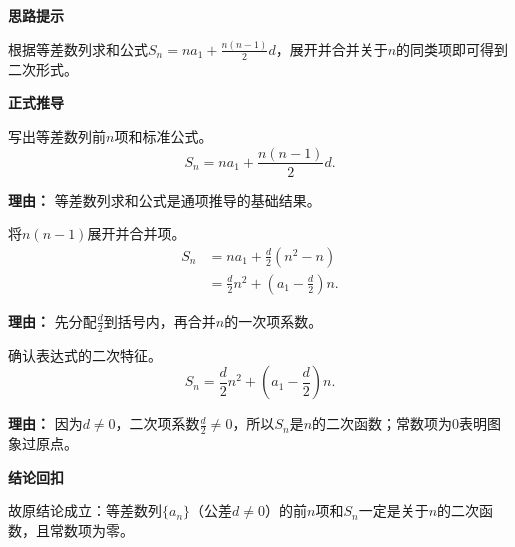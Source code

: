 \begin{proofbox}
	\textbf{\textcolor{CProof}{思路提示}}

	根据等差数列求和公式$S_n = n a_1 + \frac{n(n-1)}{2}d$，展开并合并关于$n$的同类项即可得到二次形式。

	\medskip
	\textbf{\textcolor{CProof}{正式推导}}
	\begin{description}[style=nextline, leftmargin=2.8em, labelsep=0.5em, itemsep=0.55em]
		\item[\textbf{步骤一（求和平式）：}] 写出等差数列前$n$项和标准公式。
			\[
				S_n = n a_1 + \frac{n(n-1)}{2}d.
			\]
			\par\textbf{理由：} 等差数列求和公式是通项推导的基础结果。

		\item[\textbf{步骤二（展开合并）：}] 将$n(n-1)$展开并合并项。
			\[
				\begin{aligned}
					S_n &= n a_1 + \frac{d}{2}(n^2 - n) \\
					&= \frac{d}{2}n^2 + \left(a_1 - \frac{d}{2}\right)n.
			\end{aligned}
			\]
			\par\textbf{理由：} 先分配$\frac{d}{2}$到括号内，再合并$n$的一次项系数。

		\item[\textbf{步骤三（二次确认）：}] 确认表达式的二次特征。
			\[
				S_n = \frac{d}{2}n^2 + \left(a_1 - \frac{d}{2}\right)n.
			\]
			\par\textbf{理由：} 因为$d \neq 0$，二次项系数$\frac{d}{2} \neq 0$，所以$S_n$是$n$的二次函数；常数项为$0$表明图象过原点。
	\end{description}

	\medskip
	\textbf{\textcolor{CProof}{结论回扣}}

	故原结论成立：等差数列$\{a_n\}$（公差$d\neq0$）的前$n$项和$S_n$一定是关于$n$的二次函数，且常数项为零。
\end{proofbox}
